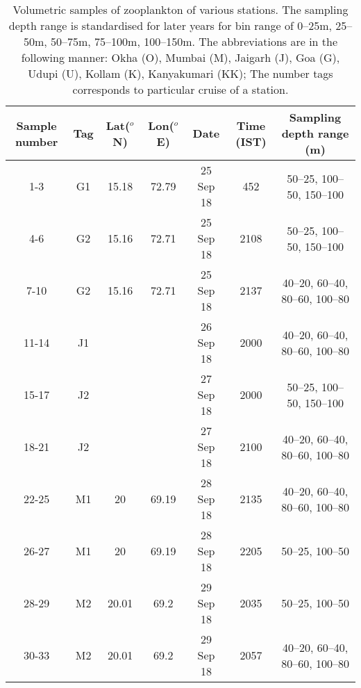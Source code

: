 \documentclass{article}
\begin{document}
\begin{table}[htbp]
	
	{\footnotesize
		\captionsetup{justification=justified,font=footnotesize,skip=0.05\baselineskip,width=\textwidth} %
		\caption{\newline Volumetric samples of zooplankton of various stations. The sampling depth range is standardised for later years for bin range of 0--25m, 25--50m, 50--75m, 75--100m, 100--150m. The abbreviations are in the following manner: Okha (O), Mumbai (M), Jaigarh (J), Goa (G), Udupi (U), Kollam (K), Kanyakumari (KK); The number tags corresponds to particular cruise of a station.}
		\begin{adjustwidth}{0in}{0in} 
			\begin{tabular}{ccccccc}
				\toprule
				Sample number & Tag & Lat($^o$N)    & Lon($^o$E)   & Date & Time (IST) & Sampling depth range (m)      \\
				\midrule
				1-3         & G1  & 15.18      & 72.79      & 25 Sep 18                 & 452        & 50–25, 100–50, 150–100        \\
				4-6         & G2  & 15.16      & 72.71      & 25 Sep 18                 & 2108       & 50–25, 100–50, 150–100        \\
				7-10        & G2  & 15.16      & 72.71      & 25 Sep 18                 & 2137       & 40–20, 60–40, 80–60, 100–80   \\
				11-14       & J1  &            &            & 26 Sep 18                 & 2000       & 40–20, 60–40, 80–60, 100–80   \\
				15-17       & J2  &            &            & 27 Sep 18                 & 2000       & 50–25, 100–50, 150–100        \\
				18-21       & J2  &            &            & 27 Sep 18                 & 2100       & 40–20, 60–40, 80–60, 100–80   \\
				22-25       & M1  & 20         & 69.19      & 28 Sep 18                 & 2135       & 40–20, 60–40, 80–60, 100–80   \\
				26-27       & M1  & 20         & 69.19      & 28 Sep 18                 & 2205       & 50–25, 100–50                 \\
				28-29       & M2  & 20.01      & 69.2       & 29 Sep 18                 & 2035       & 50–25, 100–50                 \\
				30-33       & M2  & 20.01      & 69.2       & 29 Sep 18                 & 2057       & 40–20, 60–40, 80–60, 100–80   \\

\end{tabular}
\end{adjustwidth}}
\end{table}
\end{document}
